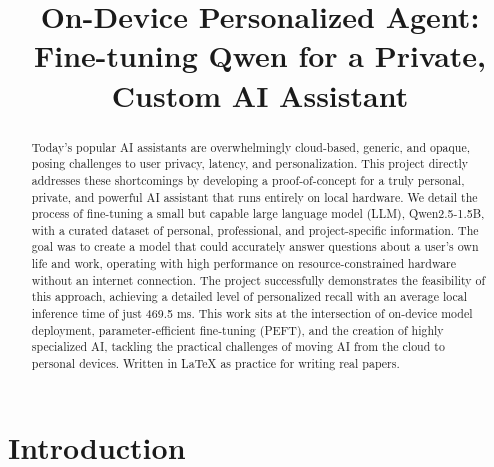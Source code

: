 \documentclass[conference]{IEEEtran}
\begin{document}
\title{On-Device Personalized Agent: Fine-tuning Qwen for a Private, Custom AI Assistant}

\author{
}

\maketitle

\begin{abstract}
Today's popular AI assistants are overwhelmingly cloud-based, generic, and opaque, posing challenges to user privacy, latency, and personalization. This project directly addresses these shortcomings by developing a proof-of-concept for a truly personal, private, and powerful AI assistant that runs entirely on local hardware. We detail the process of fine-tuning a small but capable large language model (LLM), Qwen2.5-1.5B, with a curated dataset of personal, professional, and project-specific information. The goal was to create a model that could accurately answer questions about a user's own life and work, operating with high performance on resource-constrained hardware without an internet connection. The project successfully demonstrates the feasibility of this approach, achieving a detailed level of personalized recall with an average local inference time of just 469.5 ms. This work sits at the intersection of on-device model deployment, parameter-efficient fine-tuning (PEFT), and the creation of highly specialized AI, tackling the practical challenges of moving AI from the cloud to personal devices. Written in LaTeX as practice for writing real papers.
\end{abstract}



\section{Introduction}
\end{document}
